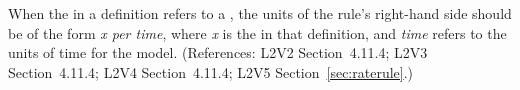 When the  in a \RateRule definition refers to a \Parameter,
the units of the rule's right-hand side should be of the form \emph{x per
time}, where \emph{x} is the  in that \Parameter definition,
and \emph{time} refers to the units of time for the model.  (References:
L2V2 Section~4.11.4; L2V3 Section~4.11.4; L2V4 Section~4.11.4; L2V5 Section~\ref{sec:raterule}.)
